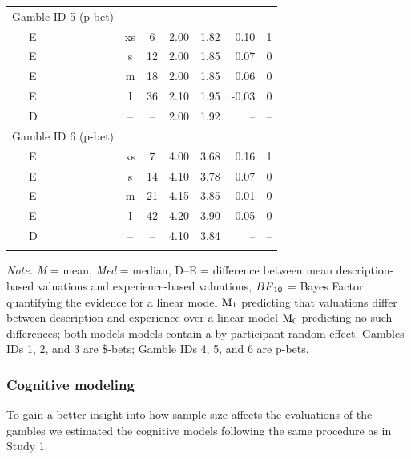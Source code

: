 \documentclass[
  a4paper, man, floatsintext]{apa6}
\begin{document}
\begin{table}[tbp]
\begin{center}
\begin{threeparttable}
\begin{tabular}{lccccrr}
Gamble ID 5 (p-bet) &  &  &  &  &  & \\
\ \ \ E & xs & 6 & 2.00 & 1.82 & 0.10 & 1\\
\ \ \ E & s & 12 & 2.00 & 1.85 & 0.07 & 0\\
\ \ \ E & m & 18 & 2.00 & 1.85 & 0.06 & 0\\
\ \ \ E & l & 36 & 2.10 & 1.95 & -0.03 & 0\\
\ \ \ D & -- & -- & 2.00 & 1.92 & -- & --\\
Gamble ID 6 (p-bet) &  &  &  &  &  & \\
\ \ \ E & xs & 7 & 4.00 & 3.68 & 0.16 & 1\\
\ \ \ E & s & 14 & 4.10 & 3.78 & 0.07 & 0\\
\ \ \ E & m & 21 & 4.15 & 3.85 & -0.01 & 0\\
\ \ \ E & l & 42 & 4.20 & 3.90 & -0.05 & 0\\
\ \ \ D & -- & -- & 4.10 & 3.84 & -- & --\\
\bottomrule
\addlinespace
\end{tabular}

\begin{tablenotes}[para]
\normalsize{\textit{Note.} \textit{M} = mean, \textit{Med} = median, D--E = difference between mean description-based valuations and experience-based valuations, $BF\textsubscript{10}$ = Bayes Factor quantifying the evidence for a linear model $\mathrm{M}\textsubscript{1}$ predicting that valuations differ between description and experience over a linear model $\mathrm{M}\textsubscript{0}$ predicting no such differences; both models models contain a by-participant random effect. Gambles IDs 1, 2, and 3 are \$-bets; Gamble IDs 4, 5, and 6 are p-bets.}
\end{tablenotes}

\end{threeparttable}
\end{center}

\end{table}

\subsubsection{Cognitive modeling}

To gain a better insight into how sample size affects the evaluations of
the gambles we estimated the cognitive models following the same
procedure as in Study 1.
\end{document}
